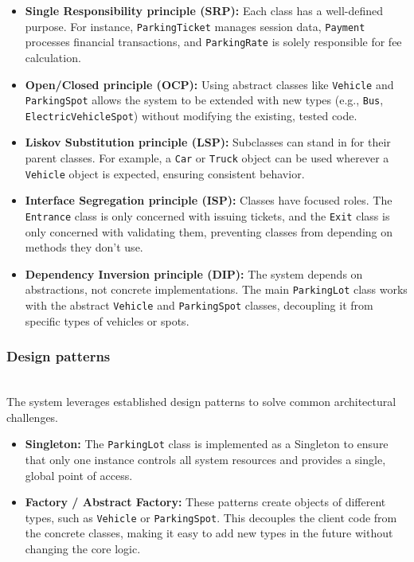 \begin{itemize}
\item
\protect{}\label{J8fwMUOIYMVYXuRLEDyKA}
\textbf{Single Responsibility principle (SRP):} Each class has a well-defined purpose. For instance, \texttt{ParkingTicket} manages session data, \texttt{Payment} processes financial transactions, and \texttt{ParkingRate} is solely responsible for fee calculation.
\item
\protect{}\label{Kp1HBvK_pAsNAkySLYLYA}
\textbf{Open/Closed principle (OCP):} Using abstract classes like \texttt{Vehicle} and \texttt{ParkingSpot} allows the system to be extended with new types (e.g., \texttt{Bus}, \texttt{ElectricVehicleSpot}) without modifying the existing, tested code.
\item
\protect{}\label{oQCjKI8Jp7yONCgRWAO7y}
\textbf{Liskov Substitution principle (LSP):} Subclasses can stand in for their parent classes. For example, a \texttt{Car} or \texttt{Truck} object can be used wherever a \texttt{Vehicle} object is expected, ensuring consistent behavior.
\item
\protect{}\label{xprWNLsWYLWLtTsXxToic}
\textbf{Interface Segregation principle (ISP):} Classes have focused roles. The \texttt{Entrance} class is only concerned with issuing tickets, and the \texttt{Exit} class is only concerned with validating them, preventing classes from depending on methods they don't use.
\item
\protect{}\label{F3xaJB1obT3DHQOc1XCAi}
\textbf{Dependency Inversion principle (DIP):} The system depends on abstractions, not concrete implementations. The main \texttt{ParkingLot} class works with the abstract \texttt{Vehicle} and \texttt{ParkingSpot} classes, decoupling it from specific types of vehicles or spots.
\end{itemize}

\subsubsection{Design patterns}\label{mXbeZg3SHIuHjnXp-cZes}
\\
The system leverages established design patterns to solve common architectural challenges.

\begin{itemize}
\item
\protect{}\label{zeYHgnektTJMfVZBFgvxy}
\textbf{Singleton:} The \texttt{ParkingLot} class is implemented as a Singleton to ensure that only one instance controls all system resources and provides a single, global point of access.
\item
\protect{}\label{tDu6MUuC0q6EcYy4mqX15}
\textbf{Factory / Abstract Factory:} These patterns create objects of different types, such as \texttt{Vehicle} or \texttt{ParkingSpot}. This decouples the client code from the concrete classes, making it easy to add new types in the future without changing the core logic.
\end{itemize}

